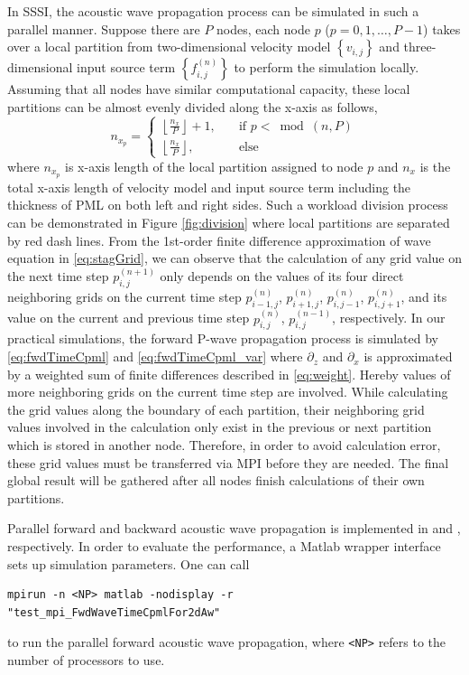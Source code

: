 \documentclass[11pt]{article}
\theoremstyle{plain}
\theoremstyle{definition}
\theoremstyle{remark}
\numberwithin{equation}{section}
\begin{document}
In SSSI, the acoustic wave propagation process can be simulated in such a parallel manner. Suppose there are $P$ nodes, each node $p$ ($p=0, 1, \dots, P-1$) takes over a local partition from two-dimensional velocity model $\left\{v_{i,j}\right\}$ and three-dimensional input source term $\left\{f_{i,j}^{(n)}\right\}$ to perform the simulation locally. Assuming that all nodes have similar computational capacity, these local partitions can be almost evenly divided along the x-axis as follows, 
\begin{equation}
  \label{eq:mpiWorkDivision}
  n_{x_p} = \left\{
  \begin{aligned}
    \left\lfloor \frac{n_x}{P} \right\rfloor + 1, \quad &\text{if } p < \bmod(n, P) \\
    \left\lfloor \frac{n_x}{P} \right\rfloor, \quad &\text{else}
  \end{aligned}
  \right.
\end{equation}
where $n_{x_p}$ is x-axis length of the local partition assigned to node $p$ and $n_x$ is the total x-axis length of velocity model and input source term including the thickness of PML on both left and right sides. Such a workload division process can be demonstrated in Figure \ref{fig:division} where local partitions are separated by red dash lines. From the 1st-order finite difference approximation of wave equation in \eqref{eq:stagGrid}, we can observe that the calculation of any grid value on the next time step $p_{i,j}^{(n+1)}$ only depends on the values of its four direct neighboring grids on the current time step $p_{i-1,j}^{(n)}$, $p_{i+1,j}^{(n)}$, $p_{i,j-1}^{(n)}$, $p_{i,j+1}^{(n)}$, and its value on the current and previous time step $p_{i,j}^{(n)}$, $p_{i,j}^{(n-1)}$, respectively. In our practical simulations, the forward P-wave propagation process is simulated by \eqref{eq:fwdTimeCpml} and \eqref{eq:fwdTimeCpml_var} where $\partial_z$ and $\partial_x$ is approximated by a weighted sum of finite differences described in \eqref{eq:weight}. Hereby values of more neighboring grids on the current time step are involved. While calculating the grid values along the boundary of each partition, their neighboring grid values involved in the calculation only exist in the previous or next partition which is stored in another node. Therefore, in order to avoid calculation error, these grid values must be transferred via MPI before they are needed. The final global result will be gathered after all nodes finish calculations of their own partitions.

Parallel forward and backward acoustic wave propagation is implemented in  and , respectively. In order to evaluate the performance, a Matlab wrapper interface  sets up simulation parameters. One can call 
\begin{lstlisting}[basicstyle=\ttfamily,keywordstyle=\color{blue}]
mpirun -n <NP> matlab -nodisplay -r
"test_mpi_FwdWaveTimeCpmlFor2dAw"
\end{lstlisting}
to run the parallel forward acoustic wave propagation, where \texttt{<NP>} refers to the number of processors to use.
\end{document}
